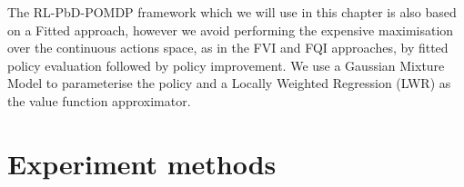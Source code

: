 The RL-PbD-POMDP framework which we will use in this chapter is also based on a Fitted approach, however we 
avoid performing the expensive maximisation over the continuous actions space, as in the FVI and FQI approaches, 
by fitted policy evaluation followed by policy improvement. We use a Gaussian Mixture Model to parameterise 
the policy and a Locally Weighted Regression (LWR) as the value function approximator.


\section{Experiment methods}\label{ch4:experiment}



%
%
%

%
%


